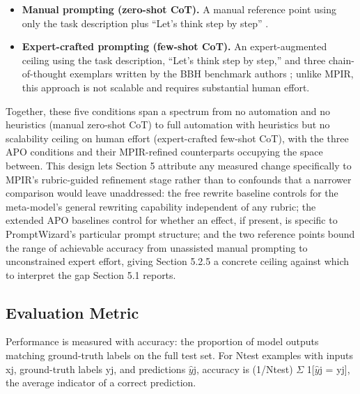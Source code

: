 \documentclass[a4paper,fleqn]{cas-sc}
\begin{document}
\begin{itemize}
\item \textbf{Manual prompting (zero-shot CoT).} A manual reference point using only the task description plus ``Let's think step by step'' \citep{kojima2022}.
\item \textbf{Expert-crafted prompting (few-shot CoT).} An expert-augmented ceiling using the task description, ``Let's think step by step,'' and three chain-of-thought exemplars written by the BBH benchmark authors \citep{suzgun2023}; unlike MPIR, this approach is not scalable and requires substantial human effort.
\end{itemize}

Together, these five conditions span a spectrum from no automation and no heuristics (manual zero-shot CoT) to full automation with heuristics but no scalability ceiling on human effort (expert-crafted few-shot CoT), with the three APO conditions and their MPIR-refined counterparts occupying the space between. This design lets Section 5 attribute any measured change specifically to MPIR's rubric-guided refinement stage rather than to confounds that a narrower comparison would leave unaddressed: the free rewrite baseline controls for the meta-model's general rewriting capability independent of any rubric; the extended APO baselines control for whether an effect, if present, is specific to PromptWizard's particular prompt structure; and the two reference points bound the range of achievable accuracy from unassisted manual prompting to unconstrained expert effort, giving Section 5.2.5 a concrete ceiling against which to interpret the gap Section 5.1 reports.

\subsection{Evaluation Metric}

Performance is measured with accuracy: the proportion of model outputs matching ground-truth labels on the full test set. For Ntest examples with inputs xj, ground-truth labels yj, and predictions $\hat{y}$j, accuracy is (1/Ntest) $\Sigma$ 1[$\hat{y}$j = yj], the average indicator of a correct prediction.
\end{document}
